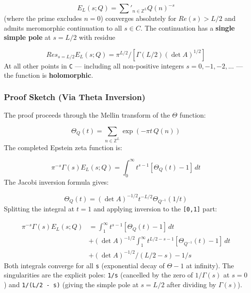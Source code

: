 \documentclass[aps,prd,preprint,superscriptaddress,longbibliography,floatfix]{revtex4-2}
\theoremstyle{remark}
\begin{document}
\begin{equation}
    E_L(s; Q) = \sum'_{n \in \mathbb{Z}^L} Q(n)^{-s}
\end{equation}
(where the prime excludes $n = 0$) converges absolutely for $Re(s) > L/2$ and admits meromorphic continuation to all $s \in C$. The continuation has a \textbf{single simple pole} at $s = L/2$ with residue


\begin{equation}
    Res_{s=L/2} E_L(s; Q) = \pi^{L/2} / [\Gamma(L/2) (\det A)^{1/2}]
\end{equation}
At all other points in \texttt{C} --- including all non-positive integers $s = 0, -1, -2, ...$ --- the function is \textbf{holomorphic}.


\subsubsection{Proof Sketch (Via Theta Inversion)}

The proof proceeds through the Mellin transform of the $\Theta$ function:


\begin{equation}
    \Theta_Q(t) = \sum_{n \in \mathbb{Z}^L} \exp(-\pi t\, Q(n))
\end{equation}
The completed Epstein zeta function is:


\begin{equation}
    \pi^{-s} \Gamma(s) E_L(s; Q) = \int_0^\infty t^{s-1} [\Theta_Q(t) - 1]\, dt
\end{equation}
The Jacobi inversion formula gives:


\begin{equation}
    \Theta_Q(t) = (\det A)^{-1/2} t^{-L/2} \Theta_{Q^{-1}}(1/t)
\end{equation}
Splitting the integral at $t = 1$ and applying inversion to the \texttt{[0,1]} part:


\begin{align}
    \pi^{-s} \Gamma(s) E_L(s; Q) &= \int_1^\infty t^{s-1} [\Theta_Q(t) - 1]\, dt \\
    & + (\det A)^{-1/2} \int_1^\infty t^{L/2-s-1} [\Theta_{Q^{-1}}(t) - 1]\, dt \\
    & + (\det A)^{-1/2} / (L/2 - s) - 1/s
\end{align}
Both integrals converge for all \texttt{s} (exponential decay of $\Theta - 1$ at infinity). The singularities are the explicit poles: \texttt{1/s} (cancelled by the zero of $1/\Gamma(s)$ at $s = 0$) and \texttt{1/(L/2 - s)} (giving the simple pole at $s = L/2$ after dividing by $\Gamma(s)$).
\end{document}
